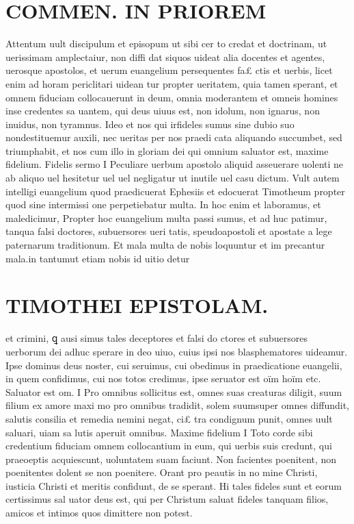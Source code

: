 \documentclass{article}
\begin{document}
\begin{pages}
\section*{COMMEN. IN PRIOREM }
\marginpar{[ p.106 ]}\pstart Attentum uult discipulum et episopum ut sibi cer to credat et doctrinam, ut uerissimam amplectaiur, non diffi dat siquos uideat alia docentes et agentes, uerosque apostolos, et uerum euangelium persequentes fa£ ctis et uerbis, licet enim ad horam periclitari uidean tur propter ueritatem, quia tamen sperant, et omnem fiduciam collocauerunt in deum, omnia moderantem et omneis homines inse credentes sa uantem, qui deus uiuus est, non idolum, non ignarus, non inuidus, non tyramnus. Ideo et nos qui irfideles sumus sine dubio suo nondestituemur auxili, nec ueritas per nos praedi cata aliquando succumbet, sed triumphabit, et nos cum illo in gloriam dei qui omnium saluator est, maxime fidelium.  \pend\pstart Fidelis sermo I Peculiare uerbum apostolo aliquid asseuerare uolenti ne ab aliquo uel hesitetur uel uel negligatur ut inutile uel casu dictum. Vult autem intelligi euangelium quod praedicuerat Ephesiis et edocuerat Timotheum propter quod sine intermissi one perpetiebatur multa.  \pend\pstart In hoc enim et laboramus, et maledicimur, Propter hoc euangelium multa passi sumus, et ad huc patimur, tanqua falsi doctores, subuersores ueri tatis, speudoapostoli et apostate a lege paternarum traditionum. Et mala multa de nobis loquuntur et im precantur mala.in tantumut etiam nobis id uitio detur  \pend
\section*{TIMOTHEI EPISTOLAM. }
\marginpar{[ p.107 ]}\pstart et crimini, ꝗ ausi simus tales deceptores et falsi do ctores et subuersores uerborum dei adhuc sperare in deo uiuo, cuius ipsi nos blasphematores uideamur. Ipse dominus deus noster, cui seruimus, cui obedimus in praedicatione euangelii, in quem confidimus, cui nos totos credimus, ipse seruator est oïm hoïm etc.  \pend\pstart Saluator est om. I Pro omnibus sollicitus est, omnes suas creaturas diligit, suum filium ex amore maxi mo pro omnibus tradidit, solem suumsuper omnes diffundit, salutis consilia et remedia nemini negat, ci£ tra condignum punit, omnes uult saluari, uiam sa lutis aperuit omnibus.  \pend\pstart Maxime fidelium I Toto corde sibi credentium fiduciam omnem collocantium in eum, qui uerbis suis credunt, qui praeoeptis acquiescunt, uoluntatem suam faciunt. Non facientes poenitent, non poenitentes dolent se non poenitere. Orant pro peautis in no mine Christi, iusticia Christi et meritis confidunt, de se sperant. Hi tales fideles sunt et eorum certissimus sal uator deus est, qui per Christum saluat fideles tanquam filios, amicos et intimos quos dimittere non potest.  \pend
{}
{}

\end{pages}
\end{document}
